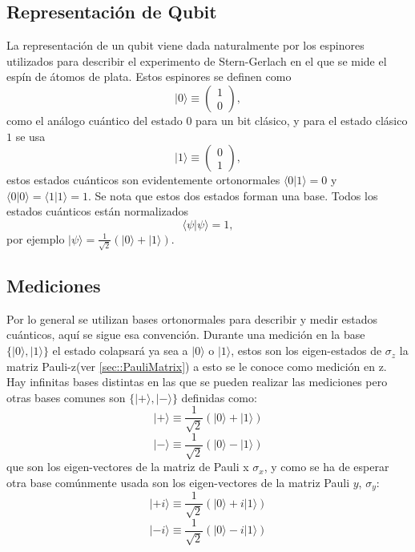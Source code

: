 \documentclass[a4paper]{article}
\begin{document}
\subsection{Representación de Qubit}
La representación de un qubit viene dada naturalmente por los espinores utilizados para describir el experimento de Stern-Gerlach en el que se mide el espín de átomos de plata. Estos espinores se definen como 
\begin{equation}\label{eq::qubit0}
|0\rangle\equiv
\begin{pmatrix}
		1\\
		0
	\end{pmatrix},
\end{equation}
como el análogo cuántico del estado $0$ para un bit clásico, y para el estado clásico $1$ se usa
\begin{equation}\label{eq::qubit1}
|1\rangle\equiv
\begin{pmatrix}
		0\\
		1
	\end{pmatrix},
\end{equation}
estos estados cuánticos son evidentemente ortonormales $\langle 0 | 1\rangle=0$ y $\langle 0 | 0\rangle=\langle 1 | 1\rangle=1$. Se nota que estos dos estados forman una base. Todos los estados cuánticos están normalizados
\begin{equation}
\langle \psi | \psi\rangle=1,
\end{equation}
por ejemplo $|\psi\rangle=\frac{1}{\sqrt{2}}(|0\rangle+|1\rangle)$.
\subsection{Mediciones}
Por lo general se utilizan bases ortonormales para describir y medir estados cuánticos, aquí se sigue esa convención. Durante una medición en la base $\{|0\rangle, |1\rangle\}$ el estado colapsará ya sea a $|0\rangle$ o $|1\rangle$, estos son los eigen-estados de $\sigma_z$ la matriz Pauli-z(ver \ref{sec::PauliMatrix}) a esto se le conoce como medición en z.\\
Hay infinitas bases distintas en las que se pueden realizar las mediciones pero otras bases comunes son $\{|+\rangle, |-\rangle \}$ definidas como:
\begin{equation}
|+\rangle\equiv\frac{1}{\sqrt{2}}(|0\rangle+|1\rangle)
\end{equation}
\begin{equation}
|-\rangle\equiv\frac{1}{\sqrt{2}}(|0\rangle-|1\rangle)
\end{equation}
que son los eigen-vectores de la matriz de Pauli x $\sigma_x$, y como se ha de esperar otra base comúnmente usada son los eigen-vectores de la matriz Pauli $y$, $\sigma_y$:
\begin{equation}
|+i\rangle\equiv\frac{1}{\sqrt{2}}(|0\rangle+i|1\rangle)
\end{equation}
\begin{equation}
|-i\rangle\equiv\frac{1}{\sqrt{2}}(|0\rangle-i|1\rangle)
\end{equation}
\end{document}
